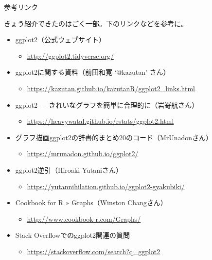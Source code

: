 \documentclass[ignorenonframetext,]{beamer}
\providecommand{\tightlist}{%
  \setlength{\itemsep}{0pt}\setlength{\parskip}{0pt}}
\begin{document}
\begin{frame}{参考リンク}

きょう紹介できたのはごく一部。下のリンクなどを参考に。

\begin{itemize}
\tightlist
\item
  ggplot2（公式ウェブサイト）

  \begin{itemize}
  \tightlist
  \item
    \url{http://ggplot2.tidyverse.org/}
  \end{itemize}
\item
  ggplot2に関する資料（前田和寛 `@kazutan' さん）

  \begin{itemize}
  \tightlist
  \item
    \url{https://kazutan.github.io/kazutanR/ggplot2_links.html}
  \end{itemize}
\item
  ggplot2 --- きれいなグラフを簡単に合理的に（岩嵜航さん）

  \begin{itemize}
  \tightlist
  \item
    \url{https://heavywatal.github.io/rstats/ggplot2.html}
  \end{itemize}
\item
  グラフ描画ggplot2の辞書的まとめ20のコード（MrUnadonさん）

  \begin{itemize}
  \tightlist
  \item
    \url{https://mrunadon.github.io/ggplot2/}
  \end{itemize}
\end{itemize}

\end{frame}

\begin{frame}

\begin{itemize}
\tightlist
\item
  ggplot2逆引（Hiroaki Yutaniさん）

  \begin{itemize}
  \tightlist
  \item
    \url{https://yutannihilation.github.io/ggplot2-gyakubiki/}
  \end{itemize}
\item
  Cookbook for R » Graphs（Winston Changさん）

  \begin{itemize}
  \tightlist
  \item
    \url{http://www.cookbook-r.com/Graphs/}
  \end{itemize}
\item
  Stack Overflowでのggplot2関連の質問

  \begin{itemize}
  \tightlist
  \item
    \url{https://stackoverflow.com/search?q=ggplot2}
  \end{itemize}
\end{itemize}

\end{frame}
\end{document}
